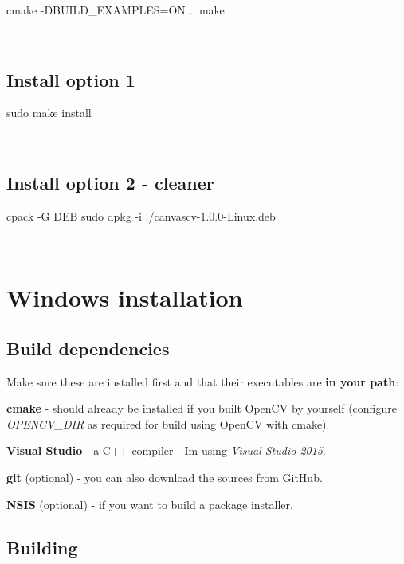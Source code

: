 \begin{DoxyVerb}cmake -DBUILD_EXAMPLES=ON ..
make
\end{DoxyVerb}
 ~\newline
\hypertarget{installlinux_ilsec5}{}\subsection{Install option 1}\label{installlinux_ilsec5}
\begin{DoxyVerb}sudo make install
\end{DoxyVerb}
 ~\newline
\hypertarget{installlinux_ilsec6}{}\subsection{Install option 2 -\/ cleaner}\label{installlinux_ilsec6}
\begin{DoxyVerb}cpack -G DEB
sudo dpkg -i ./canvascv-1.0.0-Linux.deb
\end{DoxyVerb}
 ~\newline
 \hypertarget{installwindows}{}\section{Windows installation}\label{installwindows}
\hypertarget{installwindows_iwsec1}{}\subsection{Build dependencies}\label{installwindows_iwsec1}
Make sure these are installed first and that their executables are {\bfseries in your path}\+:
\begin{DoxyItemize}
\item {\bfseries cmake} -\/ should already be installed if you built Open\+CV by yourself (configure {\itshape O\+P\+E\+N\+C\+V\+\_\+\+D\+IR} as required for build using Open\+CV with cmake).
\item {\bfseries Visual Studio} -\/ a C++ compiler -\/ I\textquotesingle{}m using {\itshape Visual Studio 2015}.
\item {\bfseries git} (optional) -\/ you can also download the sources from Git\+Hub.
\item {\bfseries N\+S\+IS} (optional) -\/ if you want to build a package installer. ~\newline

\end{DoxyItemize}\hypertarget{installwindows_iwsec2}{}\subsection{Building}\label{installwindows_iwsec2}

